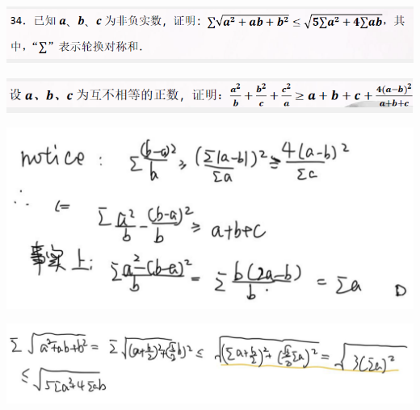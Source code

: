 \documentclass[UTF8]{ctexart}
\begin{document}
\subsection{}
\begin{center}
	\includegraphics[width=0.7\linewidth]{a06}
\end{center}
\begin{center}
	\includegraphics[width=0.7\linewidth]{a07}
\end{center}
\begin{center}
	\includegraphics[width=0.7\linewidth]{a08}
\end{center}
\begin{center}
	\includegraphics[width=0.7\linewidth]{a09}
\end{center}
\end{document}

